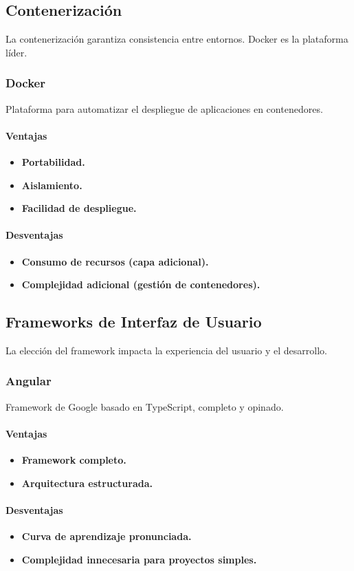 \subsection{Contenerización}
La contenerización garantiza consistencia entre entornos. Docker es la plataforma líder.
\subsubsection{Docker}
Plataforma para automatizar el despliegue de aplicaciones en contenedores.
\paragraph{Ventajas}
\begin{itemize}
\item \textbf{Portabilidad.}
\item \textbf{Aislamiento.}
\item \textbf{Facilidad de despliegue.}
\end{itemize}
\paragraph{Desventajas}
\begin{itemize}
\item \textbf{Consumo de recursos (capa adicional).}
\item \textbf{Complejidad adicional (gestión de contenedores).}
\end{itemize}

\subsection{Frameworks de Interfaz de Usuario}
La elección del framework impacta la experiencia del usuario y el desarrollo.

\subsubsection{Angular}
Framework de Google basado en TypeScript, completo y opinado.
\paragraph{Ventajas}
\begin{itemize}
\item \textbf{Framework completo.}
\item \textbf{Arquitectura estructurada.}
\end{itemize}
\paragraph{Desventajas}
\begin{itemize}
\item \textbf{Curva de aprendizaje pronunciada.}
\item \textbf{Complejidad innecesaria para proyectos simples.}
\end{itemize}

